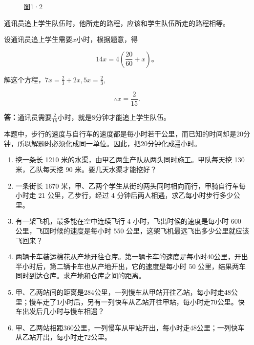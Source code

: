 \begin{figure}
\centering
{}
\caption{图1·2}
\end{figure}

通讯员追上学生队伍时，他所走的路程，应该和学生队伍所走的路程相等。

 设通讯员追上学生需要\(x\)小时，根据题意，得

\[
14 x = 4 \left(\frac{20}{60} + x\right)\text{。}
\]

解这个方程，\(7x = \frac{2}{3} +2x,5x = \frac{2}{3},\)

\[
\therefore x = \frac{2}{15}.
\]

\textbf{答：}通讯员需要\(\frac{2}{15}\)小时，就是8分钟才能追上学生队伍。

本题中，步行的速度与自行车的速度都是每小时若干公里，而已知的时间却是20分钟，所以解题时必须化成同一单位。因此，把20分钟化成\(\frac{20}{60}\)小时。

\begin{enumerate}
\item
  挖一条长 1210 米的水渠，由甲乙两生产队从两头同时施工。甲队每天挖 130
  米，乙队每天挖 90 米。要几天水渠才能挖好？
\item
  一条街长 1670
  米，甲、乙两个学生从街的两头同时相向而行，甲骑自行车每小时走 21
  公里，乙步行，经过 4 分钟后两人相遇，求乙每小时步行多少公里。
\item
  有一架飞机，最多能在空中连续飞行 4 小时，飞出时候的速度是每小时 600
  公里，飞回时候的速度是每小时 550
  公里，这架飞机最远飞出多少公里就应该飞回来？
\item
  两辆卡车装运棉花从产地开往仓库。第一辆卡车的速度是每小时40公里，开出半小时后，第二辆卡车也从产地开出，它的速度是每小时
  50 公里，结果两车同时到达仓库。求产地和仓库之间的距离。
\item
  甲、乙两站间的距离是284公里，一列慢车从甲站开往乙站，每小时走48公里；慢车走了1小时后，另有一列快车从乙站开往甲站，每小时走70公里。快车出发后几小时与慢车相遇？
\item
  甲、乙两站相距360公里，一列慢车从甲站开出，每小时走48公里；一列快车从乙站开出，每小时走72公里。
\end{enumerate}

